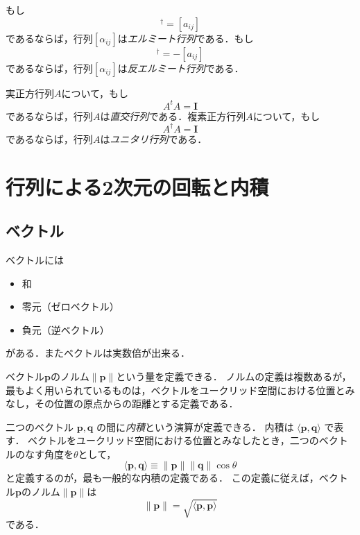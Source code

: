 \documentclass{jsbook}
\newcommand{\keyword}[1]{\emph{#1}}
\newcommand{\One}{\mathbf{I}}
\newcommand{\norm}[1]{\|{#1}\|}
\newcommand{\bvec}[1]{\boldsymbol{#1}}
\begin{document}
もし
\begin{equation}
[a_{ij}]^\dagger=[a_{ij}]
\end{equation}
であるならば，行列$[\alpha_{ij}]$は\keyword{エルミート行列}である．もし
\begin{equation}
[a_{ij}]^\dagger=-[a_{ij}]
\end{equation}
であるならば，行列$[\alpha_{ij}]$は\keyword{反エルミート行列}である．

実正方行列$A$について，もし
\begin{equation}
A^tA=\One
\end{equation}
であるならば，行列$A$は\keyword{直交行列}である．複素正方行列$A$について，もし
\begin{equation}
A^\dagger A=\One
\end{equation}
であるならば，行列$A$は\keyword{ユニタリ行列}である．


\section{行列による2次元の回転と内積}

\subsection{ベクトル}

ベクトルには
\begin{itemize}
\item 和
\item 零元（ゼロベクトル）
\item 負元（逆ベクトル）
\end{itemize}
がある．またベクトルは実数倍が出来る．

ベクトル$\bvec{p}$のノルム$\norm{\bvec{p}}$という量を定義できる．
ノルムの定義は複数あるが，最もよく用いられているものは，ベクトルをユークリッド空間における位置とみなし，その位置の原点からの距離とする定義である．

二つのベクトル $\bvec{p},\bvec{q}$ の間に\keyword{内積}という演算が定義できる．
内積は $\langle\bvec{p},\bvec{q}\rangle$ で表す．
ベクトルをユークリッド空間における位置とみなしたとき，二つのベクトルのなす角度を$\theta$として，
\begin{equation}
\langle\bvec{p},\bvec{q}\rangle\equiv\norm{\bvec{p}}\norm{\bvec{q}}\cos\theta
\end{equation}
と定義するのが，最も一般的な内積の定義である．
この定義に従えば，ベクトル$\bvec{p}$のノルム$\norm{\bvec{p}}$は
\begin{equation}
\norm{\bvec{p}}=\sqrt{\langle\bvec{p},\bvec{p}\rangle}
\end{equation}
である．
\end{document}
